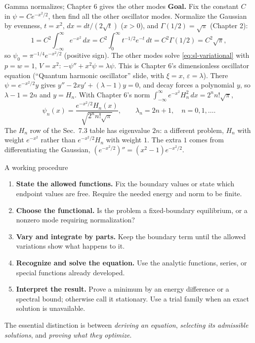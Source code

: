 \documentclass[11pt]{beamer}
\newcommand{\dd}{\,d}
\begin{document}
\begin{frame}{Gamma normalizes; Chapter 6 gives the other modes}
\small
\textbf{Goal.} Fix the constant \(C\) in \(\psi=Ce^{-x^2/2}\), then find all the other oscillator modes.
Normalize the Gaussian by evenness, $t=x^2$, $dx=dt/(2\sqrt t)$ ($x>0$), and
$\Gamma(1/2)=\sqrt\pi$ (Chapter 2):
\[
 1=C^2\int_{-\infty}^{\infty}e^{-x^2}\dd x
   =C^2\int_0^\infty t^{-1/2}e^{-t}\dd t
   =C^2\Gamma(1/2)=C^2\sqrt\pi,
\]
so $\psi_0=\pi^{-1/4}e^{-x^2/2}$ (positive sign). The other modes solve \eqref{eq:sl-variational} with $p=w=1$, $V=x^2$:
$-\psi''+x^2\psi=\lambda\psi$. This is Chapter 6's dimensionless oscillator equation
(``Quantum harmonic oscillator'' slide, with $\xi=x$, $\varepsilon=\lambda$). There
$\psi=e^{-x^2/2}y$ gives $y''-2xy'+(\lambda-1)y=0$, and decay forces a polynomial $y$,
so $\lambda-1=2n$ and $y=H_n$. With Chapter 6's norm
$\int_{-\infty}^{\infty}e^{-x^2}H_n^2\dd x=2^n n!\sqrt\pi$,
\begin{equation}
 \psi_n(x)=\frac{e^{-x^2/2}H_n(x)}{\sqrt{2^n n!\sqrt\pi}},
 \qquad \lambda_n=2n+1,\quad n=0,1,\ldots .\label{eq:hermite-modes}
\end{equation}
The $H_n$ row of the Sec.~7.3 table has eigenvalue $2n$: a different problem, $H_n$ with
weight $e^{-x^2}$ rather than $e^{-x^2/2}H_n$ with weight $1$. The extra $1$ comes from
differentiating the Gaussian, $(e^{-x^2/2})''=(x^2-1)e^{-x^2/2}$.
\end{frame}

\begin{frame}{A working procedure}
\small
\begin{enumerate}
 \item \textbf{State the allowed functions.} Fix the boundary values or state which
 endpoint values are free. Require the needed energy and norm to be finite.
 \item \textbf{Choose the functional.} Is the problem a fixed-boundary equilibrium,
 or a nonzero mode requiring normalization?
 \item \textbf{Vary and integrate by parts.} Keep the boundary term until the allowed
 variations show what happens to it.
 \item \textbf{Recognize and solve the equation.} Use the analytic functions,
 series, or special functions already developed.
 \item \textbf{Interpret the result.} Prove a minimum by an energy difference or a
 spectral bound; otherwise call it stationary. Use a trial family when an exact
 solution is unavailable.
\end{enumerate}
The essential distinction is between \emph{deriving an equation},
\emph{selecting its admissible solutions}, and \emph{proving what they optimize}.
\end{frame}
\end{document}
